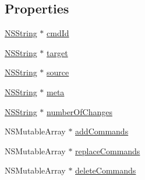 \subsection*{\-Properties}
\begin{DoxyCompactItemize}
\item 
\hyperlink{class_n_s_string}{\-N\-S\-String} $\ast$ \hyperlink{interface_sync_command_a92172d916d055119570e950ea06bfe6e}{cmd\-Id}
\item 
\hyperlink{class_n_s_string}{\-N\-S\-String} $\ast$ \hyperlink{interface_sync_command_af896f9dd1f727b8ac93e8a8b4f144fbf}{target}
\item 
\hyperlink{class_n_s_string}{\-N\-S\-String} $\ast$ \hyperlink{interface_sync_command_a1b90f5882bfb1b9611f53723fb6d7aab}{source}
\item 
\hyperlink{class_n_s_string}{\-N\-S\-String} $\ast$ \hyperlink{interface_sync_command_a77f1638229f192624ae6acae4b039ce4}{meta}
\item 
\hyperlink{class_n_s_string}{\-N\-S\-String} $\ast$ \hyperlink{interface_sync_command_ad4fa3903fa2af3ceee26c315d9a85010}{number\-Of\-Changes}
\item 
\-N\-S\-Mutable\-Array $\ast$ \hyperlink{interface_sync_command_a3cf24be80283a492327b128b98a2d5ad}{add\-Commands}
\item 
\-N\-S\-Mutable\-Array $\ast$ \hyperlink{interface_sync_command_ad40dc9bd9864c9ae84ecf599999146cf}{replace\-Commands}
\item 
\-N\-S\-Mutable\-Array $\ast$ \hyperlink{interface_sync_command_adc50e978ddc67658d5f49c8417fcc8ce}{delete\-Commands}
\end{DoxyCompactItemize}



